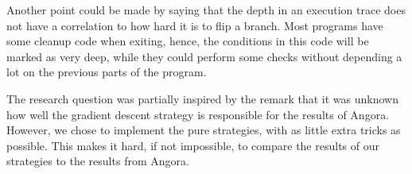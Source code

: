 Another point could be made by saying that the depth in an execution trace does not have a correlation to how hard it is to flip a branch. Most programs have some cleanup code when exiting, hence, the conditions in this code will be marked as very deep, while they could perform some checks without depending a lot on the previous parts of the program.%




The research question was partially inspired by the remark that it was unknown how well the gradient descent strategy is responsible for the results of Angora. However, we chose to implement the pure strategies, with as little extra tricks as possible. This makes it hard, if not impossible, to compare the results of our strategies to the results from Angora.

